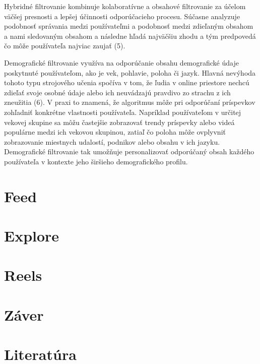 \documentclass[10pt,twoside,slovak,a4paper]{article}
\begin{document}
Hybridné filtrovanie kombinuje kolaboratívne a obsahové filtrovanie za účelom väčšej presnosti a lepšej účinnosti odporúčacieho procesu. Súčasne analyzuje podobnosť správania medzi používateľmi a podobnosť medzi zdieľaným obsahom a nami sledovaným obsahom a následne hľadá najväčšiu zhodu a tým predpovedá čo môže používateľa najviac zaujať (5).

Demografické filtrovanie využíva na odporúčanie obsahu demografické údaje poskytnuté používateľom, ako je vek, pohlavie, poloha či jazyk. Hlavná nevýhoda tohoto typu strojového učenia spočíva v tom, že ľudia v online priestore nechcú zdieľať svoje osobné údaje alebo ich neuvádzajú pravdivo zo strachu z ich zneužitia (6). V praxi to znamená, že algoritmus môže pri odporúčaní príspevkov zohľadniť konkrétne vlastnosti používateľa. Napríklad používateľom v určitej vekovej skupine sa môžu častejšie zobrazovať trendy príspevky alebo videá populárne medzi ich vekovou skupinou, zatiaľ čo poloha môže ovplyvniť zobrazovanie miestnych udalostí, podnikov alebo obsahu v ich jazyku. Demografické filtrovanie tak umožňuje personalizovať odporúčaný obsah každého používateľa v kontexte jeho širšieho demografického profilu.


\section{Feed} \label{tretia}




\section{Explore} \label{stvrta}




\section{Reels} \label{piata}



\section{Záver} \label{siesta} %
\section{Literatúra} 





\end{document}
